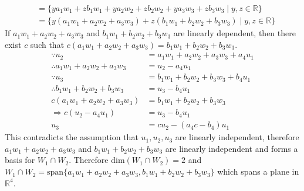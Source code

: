 \documentclass[10pt]{article}
\begin{document}
{{\begin{align}
			&= \{ya_1w_1 + zb_1w_1 + ya_2w_2 + zb_2w_2 + ya_3w_3 + zb_3w_3 \mid y, z \in \mathbb{R}\} \\
			&= \{y(a_1w_1 + a_2w_2 + a_3w_3) + z(b_1w_1 + b_2w_2 + b_3w_3) \mid y, z \in \mathbb{R}\}
		\end{align}
		If $a_1w_1 + a_2w_2 + a_3w_3$ and $b_1w_1 + b_2w_2 + b_3w_3$ are linearly 
		dependent, then there exist $c$ such that $c(a_1w_1 + a_2w_2 + a_3w_3) = 
		b_1w_1 + b_2w_2 + b_3w_3$.
		\begin{align}
			\because u_2 &= a_1w_1 + a_2w_2 + a_3w_3 + a_4u_1 \\
			\therefore a_1w_1 + a_2w_2 + a_3w_3 &= u_2 - a_4u_1 \\
			\because u_3 &= b_1w_1 + b_2w_2 + b_3w_3 + b_4u_1 \\
			\therefore b_1w_1 + b_2w_2 + b_3w_3 &= u_3 - b_4u_1 \\
			c(a_1w_1 + a_2w_2 + a_3w_3) &= b_1w_1 + b_2w_2 + b_3w_3 \\
			\Rightarrow c(u_2 - a_4u_1) &= u_3 - b_4u_1\\
			u_3 &= cu_2 - (a_4c - b_4)u_1
		\end{align}
		This contradicts the assumption that $u_1, u_2, u_3$ are linearly independent,
		therefore $a_1w_1 + a_2w_2 + a_3w_3$ and $b_1w_1 + b_2w_2 + b_3w_3$ are linearly 
		independent and forms a basis for $W_1 \cap W_2$. Therefore $\text{dim} (W_1 \cap W_2) = 2$
		and $W_1 \cap W_2 = \text{span}\{a_1w_1 + a_2w_2 + a_3w_3, b_1w_1 + b_2w_2 + b_3w_3\}$
		which spans a plane in $\mathbb{R}^4$.

	}
}
\end{document}
